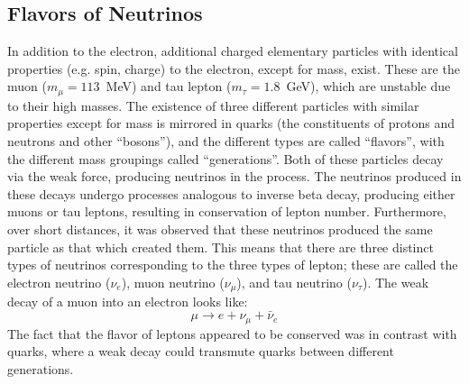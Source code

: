 \documentclass[/main.tex]{subfiles}
\begin{document}
\subsection{Flavors of Neutrinos}
In addition to the electron, additional charged elementary particles with identical properties (e.g. spin, charge) to the electron, except for mass, exist\cite{PDG2018}.
These are the muon ($m_\mu=113$~MeV) and tau lepton ($m_\tau=1.8$~GeV), which are unstable due to their high masses.
The existence of three different particles with similar properties except for mass is mirrored in quarks (the constituents of protons and neutrons and other ``bosons''), and the different types are called ``flavors'', with the different mass groupings called ``generations''.
Both of these particles decay via the weak force, producing neutrinos in the process.
The neutrinos produced in these decays undergo processes analogous to inverse beta decay, producing either muons or tau leptons, resulting in conservation of lepton number.
Furthermore, over short distances, it was observed that these neutrinos produced the same particle as that which created them.
This means that there are three distinct types of neutrinos corresponding to the three types of lepton; these are called the electron neutrino ($\nu_e$), muon neutrino ($\nu_\mu$), and tau neutrino ($\nu_\tau$).
The weak decay of a muon into an electron looks like:
\begin{equation}
  \mu \rightarrow e + \nu_\mu + \bar \nu_e
\end{equation}
The fact that the flavor of leptons appeared to be conserved was in contrast with quarks, where a weak decay could transmute quarks between different generations.
\end{document}

